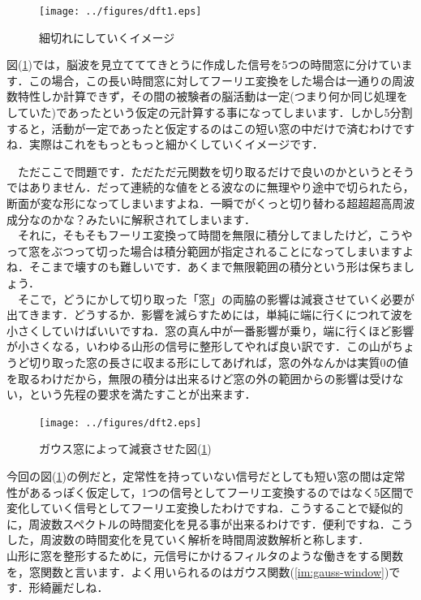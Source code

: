 \documentclass[11pt,a4paper]{ujreport} 	%
\begin{document}
\begin{figure}[H]
  \label{im:dft1}
  \centering
  \texttt{[image: ../figures/dft1.eps]}
  \caption{細切れにしていくイメージ}
\end{figure}


図(\ref{im:dft1})では，脳波を見立てててきとうに作成した信号を5つの時間窓に分けています．この場合，この長い時間窓に対してフーリエ変換をした場合は一通りの周波数特性しか計算できず，その間の被験者の脳活動は一定(つまり何か同じ処理をしていた)であったという仮定の元計算する事になってしまいます．しかし5分割すると，活動が一定であったと仮定するのはこの短い窓の中だけで済むわけですね．実際はこれをもっともっと細かくしていくイメージです．

　ただここで問題です．ただただ元関数を切り取るだけで良いのかというとそうではありません．だって連続的な値をとる波なのに無理やり途中で切られたら，断面が変な形になってしまいますよね．一瞬でがくっと切り替わる超超超高周波成分なのかな？みたいに解釈されてしまいます．\\
　それに，そもそもフーリエ変換って時間を無限に積分してましたけど，こうやって窓をぶつって切った場合は積分範囲が指定されることになってしまいますよね．そこまで壊すのも難しいです．あくまで無限範囲の積分という形は保ちましょう．
\\
　そこで，どうにかして切り取った「窓」の両脇の影響は減衰させていく必要が出てきます．どうするか．影響を減らすためには，単純に端に行くにつれて波を小さくしていけばいいですね．窓の真ん中が一番影響が乗り，端に行くほど影響が小さくなる，いわゆる山形の信号に整形してやれば良い訳です．この山がちょうど切り取った窓の長さに収まる形にしてあげれば，窓の外なんかは実質0の値を取るわけだから，無限の積分は出来るけど窓の外の範囲からの影響は受けない，という先程の要求を満たすことが出来ます．\\


\begin{figure}[H]
  \label{im:dft2}
  \centering
  \texttt{[image: ../figures/dft2.eps]}
  \caption{ガウス窓によって減衰させた図(\ref{im:dft1})}
\end{figure}

今回の図(\ref{im:dft1})の例だと，定常性を持っていない信号だとしても短い窓の間は定常性があるっぽく仮定して，1つの信号としてフーリエ変換するのではなく5区間で変化していく信号としてフーリエ変換したわけですね．こうすることで疑似的に，周波数スペクトルの時間変化を見る事が出来るわけです．便利ですね．こうした，周波数の時間変化を見ていく解析を時間周波数解析と称します．\\

山形に窓を整形するために，元信号にかけるフィルタのような働きをする関数を，窓関数と言います．よく用いられるのはガウス関数(\ref{im:gauss-window})です．形綺麗だしね．
\end{document}
